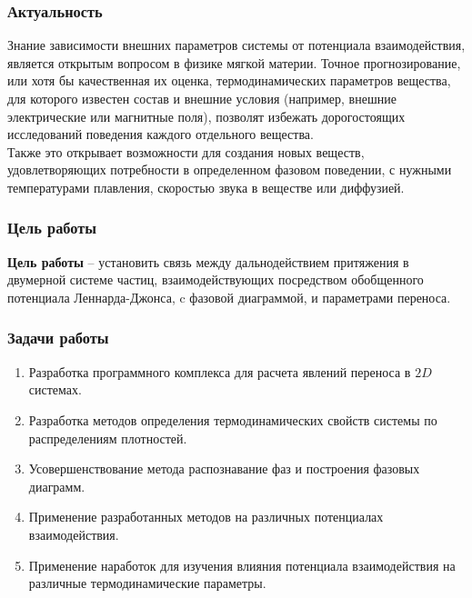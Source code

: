 \documentclass[pdf,hyperref={unicode}]{beamer}
\begin{document}



\begin{frame}
	\transdissolve[duration=0.2]
	\frametitle{Актуальность}
	
	\small{
	
Знание зависимости внешних параметров системы от потенциала взаимодействия, является открытым вопросом в физике мягкой материи. Точное прогнозирование, или хотя бы качественная их оценка, термодинамических параметров вещества, для которого известен состав и внешние условия (например, внешние электрические или магнитные поля), позволят избежать дорогостоящих исследований поведения каждого отдельного вещества. 
\\
Также это открывает возможности для создания новых веществ, удовлетворяющих потребности в определенном фазовом поведении, с нужными температурами плавления, скоростью звука в веществе или диффузией.
	}

\end{frame}

\begin{frame}
	\transdissolve[duration=0.2]
	\frametitle{Цель работы}
\small{
\textbf{Цель работы} --
установить связь между дальнодействием притяжения в двумерной системе частиц, взаимодействующих посредством обобщенного потенциала Леннарда-Джонса, c фазовой диаграммой, и параметрами переноса.
	}
\end{frame}



\begin{frame}
	\transdissolve[duration=0.2]
	\frametitle{Задачи работы}
	\small{
\begin{enumerate}
\item Разработка программного комплекса для расчета явлений переноса в $2D$ системах.
\item Разработка методов определения термодинамических свойств системы по распределениям плотностей. 
\item Усовершенствование метода распознавание фаз и построения фазовых диаграмм.
\item Применение разработанных методов на различных потенциалах взаимодействия.
\item Применение наработок для изучения влияния потенциала взаимодействия на различные термодинамические параметры.
\end{enumerate}
	}
\end{frame}
\end{document}

